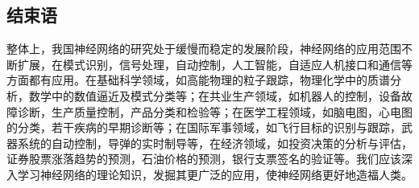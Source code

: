 \documentclass[a4paper,12pt]{article}
\begin{document}
\begin{CJK*}{UTF8}{gbsn}
	\section{结束语}
	整体上，我国神经网络的研究处于缓慢而稳定的发展阶段，神经网络的应用范围不断扩展，在模式识别，信号处理，自动控制，人工智能，自适应人机接口和通信等方面都有应用。在基础科学领域，如高能物理的粒子跟踪，物理化学中的质谱分析，数学中的数值逼近及模式分类等；在共业生产领域，如机器人的控制，设备故障诊断，生产质量控制，产品分类和检验等；在医学工程领域，如脑电图，心电图的分类，若干疾病的早期诊断等；在国际军事领域，如飞行目标的识别与跟踪，武器系统的自动控制，导弹的实时制导等，在经济领域，如投资决策的分析与评估，证券股票涨落趋势的预测，石油价格的预测，银行支票签名的验证等。我们应该深入学习神经网络的理论知识，发掘其更广泛的应用，使神经网络更好地造福人类。
\end{CJK*}
\end{document}
